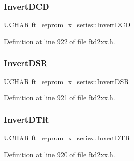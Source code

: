 \subsubsection{\texorpdfstring{Invert\+D\+CD}{InvertDCD}}
{\footnotesize\ttfamily \hyperlink{CatCaloProto40MHz_2inc_2WinTypes_8h_a4f4bb67531a9bf6f0b9c6ad76aeba587}{U\+C\+H\+AR} ft\+\_\+eeprom\+\_\+x\+\_\+series\+::\+Invert\+D\+CD}



Definition at line 922 of file ftd2xx.\+h.

\mbox{\label{structft__eeprom__x__series_a992ed18df69bfcce22ddf7e03bbcb484}} 
\subsubsection{\texorpdfstring{Invert\+D\+SR}{InvertDSR}}
{\footnotesize\ttfamily \hyperlink{CatCaloProto40MHz_2inc_2WinTypes_8h_a4f4bb67531a9bf6f0b9c6ad76aeba587}{U\+C\+H\+AR} ft\+\_\+eeprom\+\_\+x\+\_\+series\+::\+Invert\+D\+SR}



Definition at line 921 of file ftd2xx.\+h.

\mbox{\label{structft__eeprom__x__series_a9a25e68b1d2835a499fc4faeae418af8}} 
\subsubsection{\texorpdfstring{Invert\+D\+TR}{InvertDTR}}
{\footnotesize\ttfamily \hyperlink{CatCaloProto40MHz_2inc_2WinTypes_8h_a4f4bb67531a9bf6f0b9c6ad76aeba587}{U\+C\+H\+AR} ft\+\_\+eeprom\+\_\+x\+\_\+series\+::\+Invert\+D\+TR}



Definition at line 920 of file ftd2xx.\+h.

\mbox{\label{structft__eeprom__x__series_ac68d911f8f6fd11b9ffe0d397a6eeca6}} 
